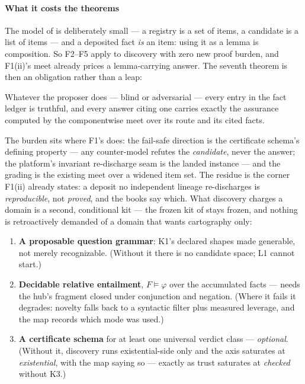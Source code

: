 \paragraph{What it costs the theorems}
The model of  is deliberately small --- a
registry is a set of items, a candidate is a list of items --- and a
deposited fact \emph{is} an item: using it as a lemma is
composition. So F2--F5 apply to discovery with zero new proof
burden, and F1(ii)'s meet already prices a lemma-carrying answer.
The seventh theorem is then an obligation rather than a leap:

\begin{theorem}
\label{thm:deposit}
Whatever the proposer does --- blind or adversarial --- every entry
in the fact ledger is truthful, and every answer citing one carries
exactly the assurance computed by the componentwise meet over its
route and its cited facts.
\end{theorem}

\noindent
The burden sits where F1's does: the fail-safe direction is the
certificate schema's defining property --- any counter-model refutes
the \emph{candidate}, never the answer; the platform's invariant
re-discharge seam is the landed instance --- and the grading is the
existing meet over a widened item set. The residue is the corner
F1(ii) already states: a deposit no independent lineage
re-discharges is \emph{reproducible}, not \emph{proved}, and the
books say which. What discovery charges a domain is a second,
conditional kit --- the frozen kit of  stays
frozen, and nothing is retroactively demanded of a domain that wants
cartography only:

\begin{enumerate}
\item[\textbf{K5}] \textbf{A proposable question grammar}: K1's
  declared shapes made generable, not merely recognizable. (Without
  it there is no candidate space; L1 cannot start.)
\item[\textbf{K6}] \textbf{Decidable relative entailment},
  $F \models \varphi$ over the accumulated facts --- needs the hub's
  fragment closed under conjunction and negation. (Where it fails it
  degrades: novelty falls back to a syntactic filter plus measured
  leverage, and the map records which mode was used.)
\item[\textbf{K7}] \textbf{A certificate schema} for at least one
  universal verdict class --- \emph{optional}. (Without it,
  discovery runs existential-side only and the axis saturates at
  \emph{existential}, with the map saying so --- exactly as trust
  saturates at \emph{checked} without K3.)
\end{enumerate}

